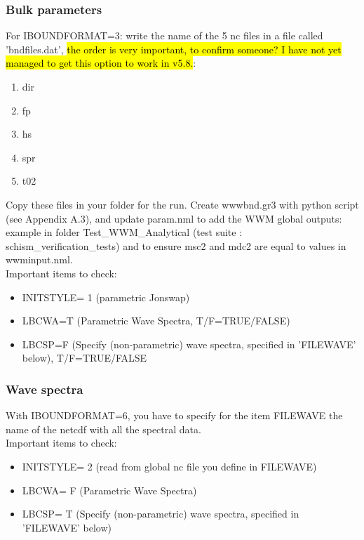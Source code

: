 \documentclass[preprints,briefreport,accept,oneauthor,pdftex]{Definitions/mdpi}
\begin{document}
\subsubsection{Bulk parameters}
\noindent For IBOUNDFORMAT=3: write the name of the 5 nc files in a file called 'bndfiles.dat', \hl{the order is very important, to confirm someone? I have not yet managed to get this option to work in v5.8.}: \begin{enumerate}
    \item dir
    \item fp
    \item hs
    \item spr
    \item t02
\end{enumerate}
Copy these files in your folder for the run. Create wwwbnd.gr3 with python script (see Appendix A.3), and update param.nml to add the WWM global outputs: example in folder Test\_WWM\_Analytical (test suite : schism\_verification\_tests) and to ensure msc2 and mdc2 are equal to values in wwminput.nml.\\
Important items to check:
\begin{itemize}
    \item INITSTYLE= 1 (parametric Jonswap)
    \item LBCWA=T (Parametric Wave Spectra, T/F=TRUE/FALSE)
    \item LBCSP=F (Specify (non-parametric) wave spectra, specified in 'FILEWAVE' below),  T/F=TRUE/FALSE
\end{itemize}
\subsubsection{Wave spectra}
\noindent With IBOUNDFORMAT=6, you have to specify for the item FILEWAVE the name of the netcdf with all the spectral data.\\
Important items to check:
\begin{itemize}
   \item INITSTYLE= 2 (read from global nc file you define in FILEWAVE)
    \item LBCWA= F (Parametric Wave Spectra)
    \item LBCSP= T (Specify (non-parametric) wave spectra, specified in 'FILEWAVE' below)
\end{itemize}

\end{document}

